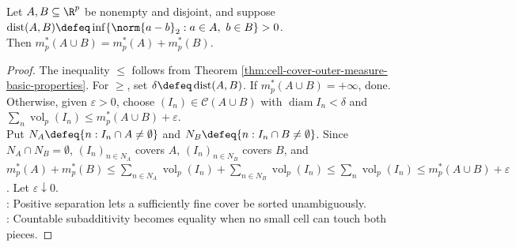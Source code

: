 \begin{theorem} \label{thm:outer-measure-positive-distance-additivity} \\
Let $A,B\subseteq\R^p$ be nonempty and disjoint, and suppose $\operatorname{dist}(A,B)\defeq\inf\{\norm{a-b}_2:a\in A,\ b\in B\}>0$.\\
Then $m_p^\ast(A\cup B)=m_p^\ast(A)+m_p^\ast(B)$.
\begin{proof}
The inequality $\leq$ follows from Theorem \ref{thm:cell-cover-outer-measure-basic-properties}. For $\geq$, set $\delta\defeq\operatorname{dist}(A,B)$. If $m_p^\ast(A\cup B)=+\infty$, done.\\
Otherwise, given $\varepsilon>0$, choose $(I_n)\in\mathcal{C}(A\cup B)$ with $\operatorname{diam}I_n<\delta$ and $\sum_n\operatorname{vol}_p(I_n)\leq m_p^\ast(A\cup B)+\varepsilon$.\\
Put $N_A\defeq\{n:I_n\cap A\neq\emptyset\}$ and $N_B\defeq\{n:I_n\cap B\neq\emptyset\}$. Since $N_A\cap N_B=\emptyset$, $(I_n)_{n\in N_A}$ covers $A$, $(I_n)_{n\in N_B}$ covers $B$, and $m_p^\ast(A)+m_p^\ast(B)\leq\sum_{n\in N_A}\operatorname{vol}_p(I_n)+\sum_{n\in N_B}\operatorname{vol}_p(I_n)\leq\sum_n\operatorname{vol}_p(I_n)\leq m_p^\ast(A\cup B)+\varepsilon$. Let $\varepsilon\downarrow0$.\\
: Positive separation lets a sufficiently fine cover be sorted unambiguously.\\
: Countable subadditivity becomes equality when no small cell can touch both pieces.
\end{proof}
\end{theorem}

